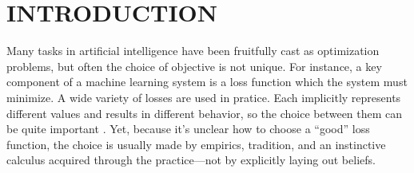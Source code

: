 \documentclass[twoside]{article}
\theoremstyle{plain}
\theoremstyle{definition}
\begin{document}
\section{INTRODUCTION}
Many tasks in artificial intelligence have been fruitfully cast as optimization problems, but often the choice of objective is not unique.
%
For instance, a key component of a machine learning system is a loss
function which the system must minimize.
A wide variety of losses are used in pratice.
Each implicitly represents different values and results in different
behavior, so the choice between them can be quite important
\parencite{wang2020comprehensive,jadon2020survey}.
Yet,
because it's unclear how to choose a ``good'' loss function,
the choice is usually made by empirics, tradition, and an instinctive calculus acquired through the practice---not by explicitly laying out beliefs.
\end{document}
